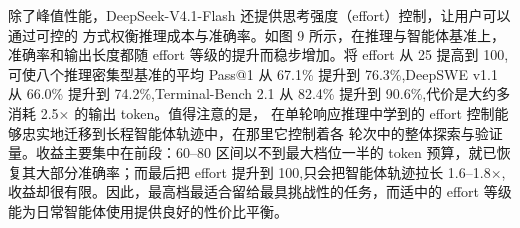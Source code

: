 除了峰值性能，DeepSeek-V4.1-Flash 还提供思考强度（effort）控制，让用户可以通过可控的
方式权衡推理成本与准确率。如图 9 所示，在推理与智能体基准上，准确率和输出长度都随
effort 等级的提升而稳步增加。将 effort 从 25 提高到 100,可使八个推理密集型基准的平均
Pass@1 从 67.1\% 提升到 76.3\%,DeepSWE v1.1 从 66.0\% 提升到 74.2\%,Terminal-Bench
2.1 从 82.4\% 提升到 90.6\%,代价是大约多消耗 2.5$\times$ 的输出 token。值得注意的是，
在单轮响应推理中学到的 effort 控制能够忠实地迁移到长程智能体轨迹中，在那里它控制着各
轮次中的整体探索与验证量。收益主要集中在前段：60--80 区间以不到最大档位一半的 token
预算，就已恢复其大部分准确率；而最后把 effort 提升到 100,只会把智能体轨迹拉长
1.6--1.8$\times$,收益却很有限。因此，最高档最适合留给最具挑战性的任务，而适中的
effort 等级能为日常智能体使用提供良好的性价比平衡。